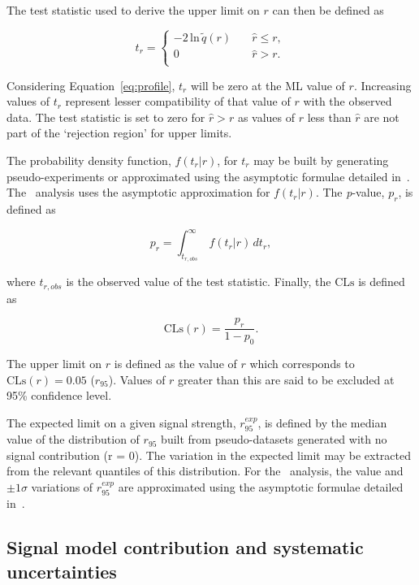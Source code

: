 The test statistic used to derive the upper limit on $r$ can then be defined as

\begin{equation}
t_r = 
\begin{cases}
-2\,\text{ln}\,\tilde{q}(r)\quad &\hat{r} \le r, \\ 
0 \quad &\hat{r} > r. \\ 
\end{cases}
\end{equation}

Considering Equation~\ref{eq:profile}, $t_r$ will be zero at the ML value of $r$.
Increasing values of $t_r$ represent lesser compatibility of that value of $r$ with
the observed data. The test statistic is set to zero for $\hat{r} > r$ as
values of $r$ less than $\hat{r}$ are not part of the `rejection region' for upper limits. 

The probability density function, $f(t_r|r)$, for $t_r$ may be built by 
generating pseudo-experiments or approximated using the asymptotic formulae 
detailed in~\cite{asymp}. The \alphat~analysis uses the asymptotic
approximation for $f(t_r|r)$. The \textit{p}-value, $p_r$, is defined as

\begin{equation}
p_r = \int_{t_{r,obs}}^{\infty}\, f(t_r|r)\, dt_r,
\end{equation}

where ${t_{r,obs}}$ is the observed value of the test statistic. Finally,
the $\text{CLs}$ is defined as

\begin{equation}
\text{CLs}(r) = \frac{p_r}{1-p_0}.
\end{equation}

The upper limit on $r$ is defined as the value of $r$ which corresponds to 
$\text{CLs}(r) = 0.05$ ($r_{95}$). Values of $r$ greater than this are said to be excluded at 95\%
confidence level.

The expected limit on a given signal strength, $r_{95}^{exp}$, is defined by the median value of the distribution
of $r_{95}$ built from pseudo-datasets generated with no signal contribution (r = 0). The variation in the 
expected limit may be extracted from the relevant quantiles of this distribution.
For the \alphat~analysis, the value and $\pm 1\sigma$ variations of $r_{95}^{exp}$ are approximated using 
the asymptotic formulae detailed in~\cite{asymp}.

\subsection{Signal model contribution and systematic uncertainties}

